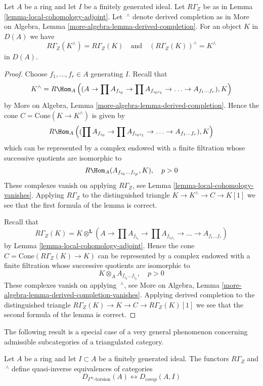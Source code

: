 \begin{lemma}
\label{lemma-complete-and-local}
Let $A$ be a ring and let $I$ be a finitely generated ideal.
Let $R\Gamma_Z$ be as in Lemma \ref{lemma-local-cohomology-adjoint}.
Let ${\ }^\wedge$ denote derived completion as in
More on Algebra, Lemma \ref{more-algebra-lemma-derived-completion}.
For an object $K$ in $D(A)$ we have
$$
R\Gamma_Z(K^\wedge) = R\Gamma_Z(K)
\quad\text{and}\quad
(R\Gamma_Z(K))^\wedge = K^\wedge
$$
in $D(A)$.
\end{lemma}

\begin{proof}
Choose $f_1, \ldots, f_r \in A$ generating $I$. Recall that
$$
K^\wedge = R\Hom_A\left((A \to \prod A_{f_{i_0}}
\to \prod A_{f_{i_0i_1}} \to \ldots \to A_{f_1 \ldots f_r}), K\right)
$$
by More on Algebra, Lemma \ref{more-algebra-lemma-derived-completion}.
Hence the cone $C = \text{Cone}(K \to K^\wedge)$
is given by
$$
R\Hom_A\left((\prod A_{f_{i_0}}
\to \prod A_{f_{i_0i_1}} \to \ldots \to A_{f_1 \ldots f_r}), K\right)
$$
which can be represented by a complex endowed with a finite filtration
whose successive quotients are isomorphic to
$$
R\Hom_A(A_{f_{i_0} \ldots f_{i_p}}, K), \quad p > 0
$$
These complexes vanish on applying $R\Gamma_Z$, see
Lemma \ref{lemma-local-cohomology-vanishes}. Applying $R\Gamma_Z$
to the distinguished triangle $K \to K^\wedge \to C \to K[1]$
we see that the first formula of the lemma is correct.

\medskip\noindent
Recall that
$$
R\Gamma_Z(K) =
K \otimes^\mathbf{L} (A \to \prod A_{f_{i_0}}
\to \prod A_{f_{i_0i_1}} \to \ldots \to A_{f_1 \ldots f_r})
$$
by Lemma \ref{lemma-local-cohomology-adjoint}.
Hence the cone $C = \text{Cone}(R\Gamma_Z(K) \to K)$
can be represented by a complex endowed with a finite filtration
whose successive quotients are isomorphic to
$$
K \otimes_A A_{f_{i_0} \ldots f_{i_p}}, \quad p > 0
$$
These complexes vanish on applying ${\ }^\wedge$, see
More on Algebra, Lemma \ref{more-algebra-lemma-derived-completion-vanishes}.
Applying derived completion to the distinguished triangle
$R\Gamma_Z(K) \to K \to C \to R\Gamma_Z(K)[1]$
we see that the second formula of the lemma is correct.
\end{proof}

\noindent
The following result is a special case of a very general phenomenon
concerning admissible subcategories of a triangulated category.

\begin{proposition}
\label{proposition-torsion-complete}
Let $A$ be a ring and let $I \subset A$ be a finitely generated ideal.
The functors $R\Gamma_Z$ and ${\ }^\wedge$
define quasi-inverse equivalences of categories
$$
D_{I^\infty\text{-torsion}}(A) \leftrightarrow D_{comp}(A, I)
$$
\end{proposition}

